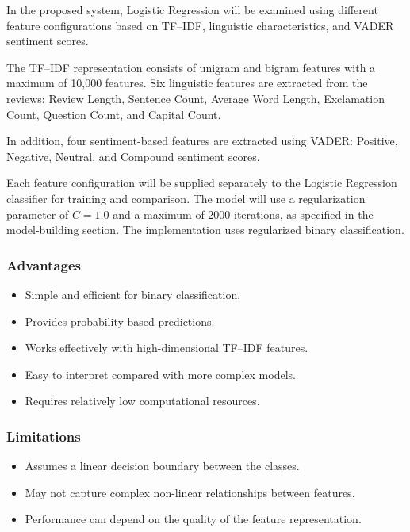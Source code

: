 \documentclass[12pt,a4paper]{report}
\begin{document}
In the proposed system, Logistic Regression will be examined using different feature configurations based on TF--IDF, linguistic characteristics, and VADER sentiment scores.

The TF--IDF representation consists of unigram and bigram features with a maximum of 10,000 features. Six linguistic features are extracted from the reviews: Review Length, Sentence Count, Average Word Length, Exclamation Count, Question Count, and Capital Count.

In addition, four sentiment-based features are extracted using VADER: Positive, Negative, Neutral, and Compound sentiment scores.

Each feature configuration will be supplied separately to the Logistic Regression classifier for training and comparison. The model will use a regularization parameter of \(C=1.0\) and a maximum of 2000 iterations, as specified in the model-building section. The implementation uses regularized binary classification.

\subsubsection*{Advantages}

\begin{itemize}
    \item Simple and efficient for binary classification.
    \item Provides probability-based predictions.
    \item Works effectively with high-dimensional TF--IDF features.
    \item Easy to interpret compared with more complex models.
    \item Requires relatively low computational resources.
\end{itemize}

\subsubsection*{Limitations}

\begin{itemize}
    \item Assumes a linear decision boundary between the classes.
    \item May not capture complex non-linear relationships between features.
    \item Performance can depend on the quality of the feature representation.
\end{itemize}
\end{document}
